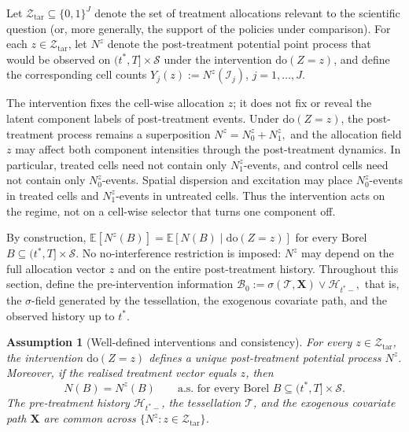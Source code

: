 \documentclass{statsoc}
\newtheorem{assumption}[assumption]{Assumption}
\newcommand{\bbE}{\mathbb{E}}
\newcommand{\1}{\mathbbm{1}}
\newcommand{\CovX}{\mathbf{X}}
\newcommand{\Fobs}{\mathcal H}
\newcommand{\Nproc}{N}
\newcommand{\Nzero}{N_0}
\newcommand{\None}{N_1}
\begin{document}
Let \(\mathcal Z_{\mathrm{tar}}\subseteq \{0,1\}^J\) denote the set of treatment allocations relevant to the scientific question (or, more generally, the support of the policies under comparison). For each \(z\in\mathcal Z_{\mathrm{tar}}\), let \(\Nproc^z\) denote the post-treatment potential point process that would be observed on \((t^\ast,T]\times\mathcal S\) under the intervention \(\mathrm{do}(Z=z)\), and define the corresponding cell counts \(Y_j(z):=\Nproc^z(\mathcal I_j)\), \(j=1,\ldots,J\).

The intervention fixes the cell-wise allocation \(z\); it does not fix or reveal the latent component labels of post-treatment events. Under \(\mathrm{do}(Z=z)\), the post-treatment process remains a superposition
\(
\Nproc^z=\Nzero^z+\None^z,
\)
and the allocation field \(z\) may affect both component intensities through the post-treatment dynamics. In particular, treated cells need not contain only \(\None^z\)-events, and control cells need not contain only \(\Nzero^z\)-events. Spatial dispersion and excitation may place \(\Nzero^z\)-events in treated cells and \(\None^z\)-events in untreated cells. Thus the intervention acts on the regime, not on a cell-wise selector that turns one component off.

By construction, \(\bbE[\Nproc^z(B)] = \bbE[\Nproc(B)\mid \mathrm{do}(Z=z)]\) for every Borel \(B\subseteq (t^\ast,T]\times\mathcal S\). No no-interference restriction is imposed: \(\Nproc^z\) may depend on the full allocation vector \(z\) and on the entire post-treatment history. Throughout this section, define the pre-intervention information
\(
\mathcal B_0:=\sigma(\mathcal T,\CovX)\vee \Fobs_{t^\ast-},
\)
that is, the \(\sigma\)-field generated by the tessellation, the exogenous covariate path, and the observed history up to \(t^\ast\).

\begin{assumption}[Well-defined interventions and consistency]\label{ass:id-consistency}
For every \(z\in\mathcal Z_{\mathrm{tar}}\), the intervention \(\mathrm{do}(Z=z)\) defines a unique post-treatment potential process \(\Nproc^z\). Moreover, if the realised treatment vector equals \(z\), then
\[
\Nproc(B)=\Nproc^z(B)\qquad\text{a.s. for every Borel }B\subseteq (t^\ast,T]\times\mathcal S.
\]
The pre-treatment history \(\Fobs_{t^\ast-}\), the tessellation \(\mathcal T\), and the exogenous covariate path \(\CovX\) are common across \(\{\Nproc^z:z\in\mathcal Z_{\mathrm{tar}}\}\).
\end{assumption}
\end{document}
